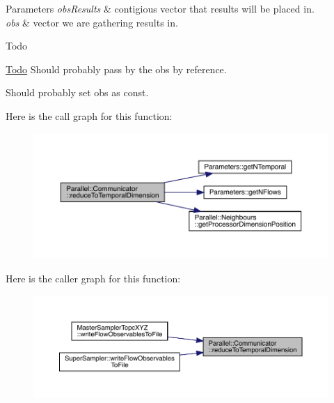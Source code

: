 \begin{DoxyParams}{Parameters}
{\em obs\+Results} & contigious vector that results will be placed in. \\
\hline
{\em obs} & vector we are gathering results in.\\
\hline
\end{DoxyParams}
\begin{DoxyRefDesc}{Todo}
\item[\mbox{\hyperlink{todo__todo000006}{Todo}}]Should probably pass by the obs by reference. 

Should probably set obs as const. \end{DoxyRefDesc}
Here is the call graph for this function\+:\nopagebreak
\begin{figure}[H]
\begin{center}
\leavevmode
\includegraphics[width=350pt]{class_parallel_1_1_communicator_a5d42989e7a3022de6042e3503aa35346_cgraph}
\end{center}
\end{figure}
Here is the caller graph for this function\+:\nopagebreak
\begin{figure}[H]
\begin{center}
\leavevmode
\includegraphics[width=350pt]{class_parallel_1_1_communicator_a5d42989e7a3022de6042e3503aa35346_icgraph}
\end{center}
\end{figure}
\mbox{\label{class_parallel_1_1_communicator_a14aa3d54f5efe28094df886948e3dee2}} 

